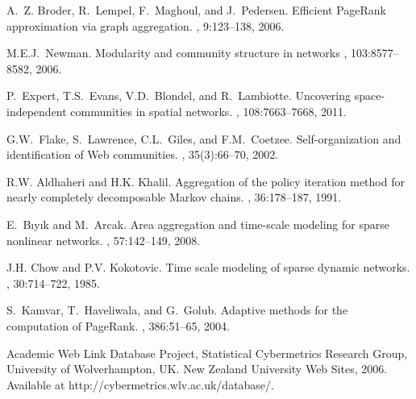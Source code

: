 \documentclass[11pt,draftcls,onecolumn]{IEEEtran}
\begin{document}
\begin{thebibliography}{1}
A.~Z. Broder, R.~Lempel, F.~Maghoul, and J.~Pedersen.
\newblock Efficient {P}age{R}ank approximation via graph aggregation.
, 9:123--138, 2006.

M.{\;}E.{\;}J.~Newman.
\newblock Modularity and community structure in networks
, 
103:8577--8582, 2006.

P.~Expert, T.\;S.~Evans, V.{\;}D.~Blondel, and R.\ Lambiotte.
\newblock Uncovering space-independent communities in spatial networks.
, 
108:7663--7668, 2011.

G.\;W.~Flake, S.~Lawrence, C.\;L.~Giles, and F.\;M.\ Coetzee.
\newblock Self-organization and identification of Web communities.
, 35(3):66--70, 2002.



R.{\;}W. Aldhaheri and H.{\;}K. Khalil.
\newblock Aggregation of the policy iteration method for nearly completely
  decomposable {M}arkov chains.
, 36:178--187, 1991.

E.~B{\i}y{\i}k and M.~Arcak.
\newblock Area aggregation and time-scale modeling for sparse nonlinear
  networks.
, 57:142--149, 2008.

J.{\;}H. Chow and P.{\;}V. Kokotovic.
\newblock Time scale modeling of sparse dynamic networks.
, 30:714--722, 1985.


S.~Kamvar, T.~Haveliwala, and G.~Golub.
\newblock Adaptive methods for the computation of {P}age{R}ank.
, 386:51--65, 2004.

Academic Web Link Database Project, 
Statistical Cybermetrics Research Group,
University of Wolverhampton, UK.
New Zealand University Web Sites, 2006.
\newblock 
Available at http://cybermetrics.wlv.ac.uk/database/.



\end{thebibliography}
\end{document}
